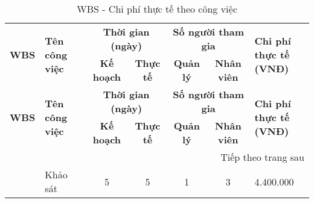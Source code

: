 \clearpage
\begin{longtable}{|c|p{3cm}|c|c|c|c|p{3cm}|}
    \caption{WBS - Chi phí thực tế theo công việc}                                                                                                                                                                                                                                                         \\
    \hline
    \multirow{2}{*}{\textbf{WBS}}   & \multirow{2}{*}{\textbf{Tên công việc}}                       & \multicolumn{2}{c|}{\textbf{Thời gian (ngày)}} & \multicolumn{2}{c|}{\textbf{Số người tham gia}} & \multirow{2}{*}{\parbox{3cm}{\centering \textbf{Chi phí thực tế                                   \\ (VNĐ)}}} \\ \cline{3-6}
                                    &                                                               & \textbf{Kế hoạch}                              & \textbf{Thực tế}                                & \textbf{Quản lý}                                                & \textbf{Nhân viên} &            \\ \hline
    \endfirsthead
    \hline
    \multirow{2}{*}{\textbf{WBS}}   & \multirow{2}{*}{\textbf{Tên công việc}}                       & \multicolumn{2}{c|}{\textbf{Thời gian (ngày)}} & \multicolumn{2}{c|}{\textbf{Số người tham gia}} & \multirow{2}{*}{\parbox{3cm}{\centering \textbf{Chi phí thực tế                                   \\ (VNĐ)}}} \\ \cline{3-6}
                                    &                                                               & \textbf{Kế hoạch}                              & \textbf{Thực tế}                                & \textbf{Quản lý}                                                & \textbf{Nhân viên} &            \\ \hline
    \endhead
    \hline \multicolumn{7}{|r|}{{Tiếp theo trang sau}}                                                                                                                                                                                                                                                     \\ \hline
    \endfoot
    \hline
    \endlastfoot
    1                               & Khảo sát                                                      & 5                                              & 5                                               & 1                                                               & 3                  & 4.400.000  \\ \hline

\end{longtable}
